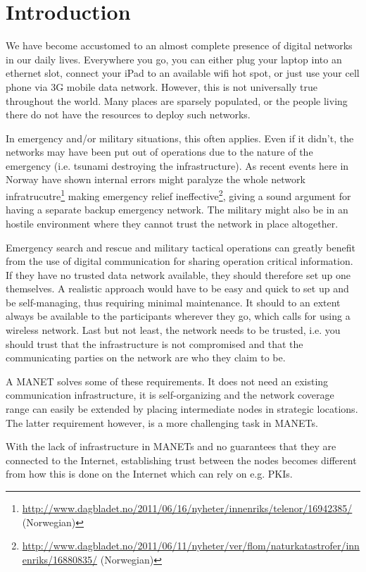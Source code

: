 \chapter{Introduction}
\label{ch:intro}
\acresetall
We have become accustomed to an almost complete presence of digital networks
in our daily lives. Everywhere you go, you can either plug your laptop into an
ethernet slot, connect your iPad to an available wifi hot spot, or just use
your cell phone via 3G mobile data network. However, this is not universally
true throughout the world. Many places are sparsely populated, or the people
living there do not have the resources to deploy such networks.

In emergency and/or military situations, this often applies. Even if it didn't,
the networks may have been put out of operations due to the nature of the
emergency (i.e. tsunami destroying the infrastructure). As recent events
here in Norway have shown internal errors might paralyze the whole network 
infratrucutre\footnote{\url{http://www.dagbladet.no/2011/06/16/nyheter/innenriks/telenor/16942385/}
(Norwegian)} making emergency relief ineffective\footnote{\url{http://www.dagbladet.no/2011/06/11/nyheter/ver/flom/naturkatastrofer/innenriks/16880835/}
(Norwegian)}, giving a sound argument for having a separate backup emergency
network. The military might also be in an hostile environment where they cannot trust
the network in place altogether.

Emergency search and rescue and military tactical operations can greatly benefit
from the use of digital communication for sharing operation critical
information. If they have no trusted data network available, they should
therefore set up one themselves. A realistic approach would have to be easy and
quick to set up and be self-managing, thus requiring minimal maintenance. It
should to an extent always be available to the participants wherever they go,
which calls for using a wireless network. Last but not least, the network needs
to be trusted, i.e. you should trust that the infrastructure is not compromised
and that the communicating parties on the network are who they claim to be.

A \ac{MANET} solves some of these requirements. It does not need an existing
communication infrastructure, it is self-organizing and the network coverage
range can easily be extended by placing intermediate nodes in strategic
locations. The latter requirement however, is a more challenging task in
\acp{MANET}.

With the lack of infrastructure in \acp{MANET} and no guarantees that they are
connected to the Internet, establishing trust between the nodes becomes
different from how this is done on the Internet which can rely on e.g.
\acp{PKI}.

